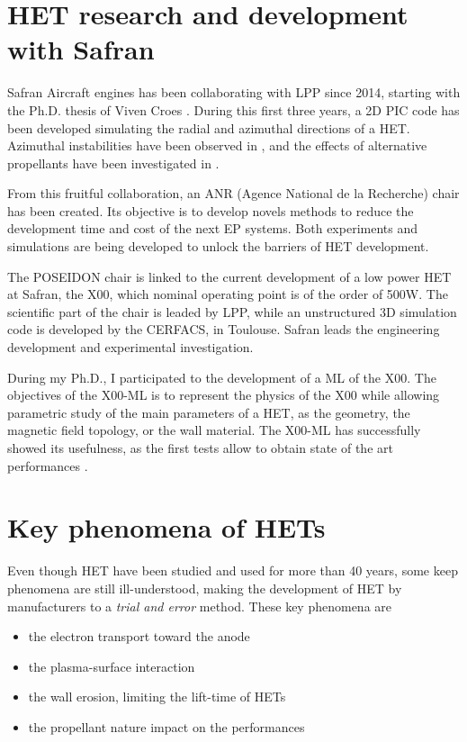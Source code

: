 

\section*{\ac{HET} research and development with Safran}
\label{sec-poseidon}



Safran Aircraft engines has been collaborating with \ac{LPP} since 2014, starting with the Ph.D. thesis of Viven Croes \citep{croes2017}.
During this first three years, a \ac{2D} \ac{PIC} code has been developed simulating the radial and azimuthal directions of a \ac{HET}.
Azimuthal instabilities have been observed in \citet{croes2017a}, and the effects of alternative propellants have been investigated in \citet{croes2018}.

From this fruitful collaboration, an ANR (Agence National de la Recherche) chair has been created.
Its objective is to develop novels methods to reduce the development time and cost of the next \ac{EP} systems.
Both experiments and simulations are being developed to unlock the barriers of \ac{HET} development.

The POSEIDON chair is linked to the current development of a  low power \ac{HET} at Safran, the \PPS X00, which nominal operating point is of the order of 500W.
The scientific part of the chair is leaded by \ac{LPP}, while an unstructured \ac{3D} simulation code is developed by the CERFACS, in Toulouse.
Safran leads the engineering development and experimental investigation.

During my Ph.D., I participated to the development of a \ac{ML} of the \PPS X00.
The objectives of the \PPS X00-\ac{ML}  is to represent the physics of the \PPS X00 while allowing parametric study of the main parameters of a \ac{HET}, as the geometry, the magnetic field topology, or the wall material.
The \PPS X00-\ac{ML} has successfully showed its usefulness, as the first tests allow to obtain state of the art performances \citep{vaudolon2018}.


\section*{Key phenomena of \ac{HET}s}

Even though \ac{HET} have been studied and used for more than 40 years, some keep phenomena are still ill-understood, making the development of \ac{HET} by manufacturers to a \emph{ trial and error} method.
These key phenomena are
\begin{itemize}
  \item the electron transport toward the anode
  \item the plasma-surface interaction 
  \item the wall erosion, limiting the lift-time of \ac{HET}s
  \item the propellant nature impact on the performances
\end{itemize}

